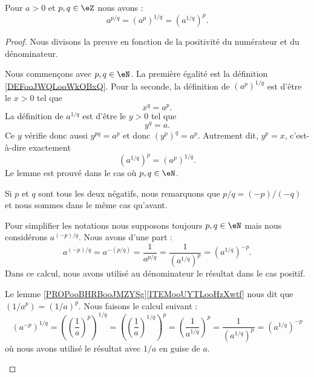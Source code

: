 \begin{lemma}        \label{LEMooIDLJooZALNaD}
	Pour \( a>0\) et \( p,q\in \eZ\) nous avons :
	\begin{equation}
		a^{p/q}=(a^p)^{1/q}=(a^{1/q})^p.
	\end{equation}
\end{lemma}

\begin{proof}
	Nous divisons la preuve en fonction de la positivité du numérateur et du dénominateur.
	\begin{subproof}

		Nous commençons avec \( p,q\in \eN\). La première égalité est la définition \ref{DEFooJWQLooWkOBxQ}. Pour la seconde, la définition de \( (a^p)^{1/q}\) est d'être le \( x>0\) tel que
		\begin{equation}
			x^q=a^p.
		\end{equation}
		La définition de \( a^{1/q}\) est d'être le \( y>0\) tel que
		\begin{equation}
			y^q=a.
		\end{equation}
		Ce \( y\) vérifie donc aussi \( y^{pq}=a^p\) et donc \( (y^p)^q=a^p\). Autrement dit, \( y^p=x\), c'est-à-dire exactement
		\begin{equation}
			(a^{1/q})^p=(a^p)^{1/q}.
		\end{equation}
		Le lemme est prouvé dans le cas où \( p,q\in \eN\).


		Si \( p\) et \( q\) sont tous les deux négatifs, nous remarquons que \( p/q=(-p)/(-q)\) et nous sommes dans le même cas qu'avant.


		Pour simplifier les notations nous supposons toujours \( p,q\in \eN\) mais nous considérons \( a^{(-p)/q}\). Nous avons d'une part :
		\begin{equation}
			a^{(-p)/q}=a^{-(p/q)}=\frac{1}{ a^{p/q} }=\frac{1}{ (a^{1/q})^p }=(a^{1/q})^{-p}.
		\end{equation}
		Dans ce calcul, nous avons utilisé au dénominateur le résultat dans le cas positif.

        Le lemme \ref{PROPooBHRBooJMZYSg}\ref{ITEMooUYTLooHzXwtf} nous dit que \( (1/a^p)=(1/a)^p\). Nous faisons le calcul suivant :
		\begin{equation}
			(a^{-p})^{1/q}=\left( \left( \frac{1}{ a } \right)^p \right)^{1/q}=\left( \left( \frac{1}{ a } \right)^{1/q} \right)^p=\left( \frac{1}{ a^{1/q} } \right)^p=\frac{1}{ (a^{1/q})^p }=(a^{1/q})^{-p}
		\end{equation}
		où nous avons utilisé le résultat avec \( 1/a\) en guise de \( a\).


\end{subproof}
\end{proof}
